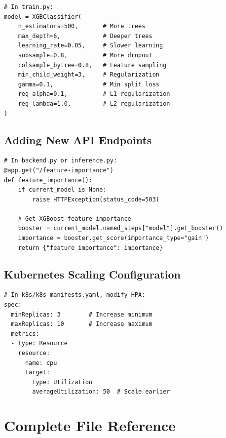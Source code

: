 \documentclass[11pt,a4paper]{article}
\begin{document}
\begin{lstlisting}[style=pythonstyle]
# In train.py:
model = XGBClassifier(
    n_estimators=500,       # More trees
    max_depth=6,            # Deeper trees
    learning_rate=0.05,     # Slower learning
    subsample=0.8,          # More dropout
    colsample_bytree=0.8,   # Feature sampling
    min_child_weight=3,     # Regularization
    gamma=0.1,              # Min split loss
    reg_alpha=0.1,          # L1 regularization
    reg_lambda=1.0,         # L2 regularization
)
\end{lstlisting}

\subsection{Adding New API Endpoints}

\begin{lstlisting}[style=pythonstyle]
# In backend.py or inference.py:
@app.get("/feature-importance")
def feature_importance():
    if current_model is None:
        raise HTTPException(status_code=503)

    # Get XGBoost feature importance
    booster = current_model.named_steps["model"].get_booster()
    importance = booster.get_score(importance_type="gain")
    return {"feature_importance": importance}
\end{lstlisting}

\subsection{Kubernetes Scaling Configuration}

\begin{lstlisting}[style=yamlstyle]
# In k8s/k8s-manifests.yaml, modify HPA:
spec:
  minReplicas: 3        # Increase minimum
  maxReplicas: 10       # Increase maximum
  metrics:
  - type: Resource
    resource:
      name: cpu
      target:
        type: Utilization
        averageUtilization: 50  # Scale earlier
\end{lstlisting}

\section{Complete File Reference}
\end{document}
